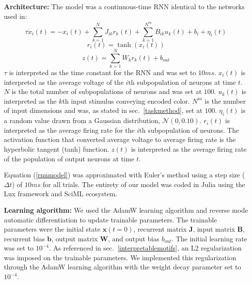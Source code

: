 \documentclass[conference]{IEEEtran}
\begin{document}
\textbf{Architecture:} The model was a continuous-time RNN identical to the networks used in\cite{sussillo2013opening,mante2013context,kay2022neural,pals2023trained,sussillo2015neural,cueva2018emergence}:
\begin{equation}
    \tau \dot{x}_i(t) = -x_i(t) + \sum^{N}_{k=1} J_{ik}r_k(t) + \sum^{N^{in}}_{k=1}B_{ik}u_k(t) + b_i + \eta_i(t)\label{rnnmodel}
\end{equation}
\begin{equation}
    r_i(t) = \tanh(x_i(t))
\end{equation}
\begin{equation}
    z(t) = \sum^{N}_{k=1}W_{k}r_k(t) + b_{out}
\end{equation}
$\tau$ is interpreted as the time constant for the RNN and was set to $10 ms$. $x_i(t)$ is interpreted as the average voltage of the $i$th subpopulation of neurons at time $t$. $N$ is the total number of subpopulations of neurons and was set at $100$. $u_k(t)$ is interpreted as the $k$th input stimulus conveying encoded color. $N^{in}$ is the number of input dimensions and was, as stated in sec.~\ref{taskmethod}, set at $100$. $\eta_i(t)$ is a random value drawn from a Gaussian distribution, $\mathcal{N}(0,0.10)$. $r_i(t)$ is interpreted as the average firing rate for the $i$th subpopulation of neurons. The activation function that converted average voltage to average firing rate is the hyperbolic tangent (tanh) function. $z(t)$ is interpreted as the average firing rate of the population of output neurons at time $t$.

Equation (\ref{rnnmodel}) was approximated with Euler's method using a step size ($\Delta t$) of $10 ms$ for all trials. The entirety of our model was coded in Julia\cite{bezanson2017julia} using the Lux framework\cite{pal2022lux} and SciML ecosystem\cite{rackauckas2017differentialequations,rackauckas2020universal}.

\textbf{Learning algorithm:} We used the AdamW learning algorithm\cite{loshchilov2017decoupled} and reverse mode automatic differentiation to update trainable parameters. The trainable parameters were the initial state $\textbf{x}(t=0)$, recurrent matrix $\textbf{J}$, input matrix $\textbf{B}$, recurrent bias $\textbf{b}$, output matrix $\textbf{W}$, and output bias $b_{out}$. The initial learning rate was set to $10^{-4}$. As referenced in sec.~\ref{interpretablemotifs}, an L2 regularization was imposed on the trainable parameters. We implemented this regularization through the AdamW learning algorithm with the weight decay parameter set to $10^{-4}$.
\end{document}
